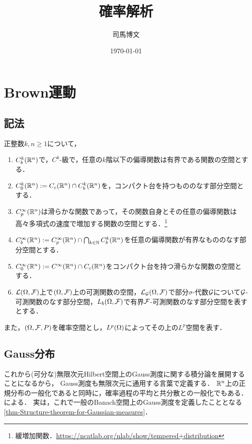 \documentclass[uplatex,dvipdfmx]{jsreport}
\title{確率解析}
\author{司馬博文}
\date{\today}
\begin{document}
\tableofcontents

\chapter{Brown運動}



\section{記法}

\begin{notation}
    正整数$k,n\ge1$について，
    \begin{enumerate}
        \item $C_b^k(\mathbb{R}^n)$で，$C^k$-級で，任意の$k$階以下の偏導関数は有界である関数の空間とする．
        \item $C_0^k(\mathbb{R}^n):=C_c(\mathbb{R}^n)\cap C_b^k(\mathbb{R}^n)$を，コンパクト台を持つもののなす部分空間とする．
        \item $C_p^\infty(\mathbb{R}^n)$は滑らかな関数であって，その関数自身とその任意の偏導関数は高々多項式の速度で増加する関数の空間とする．\footnote{緩増加関数．\url{https://ncatlab.org/nlab/show/tempered+distribution}}
        \item $C_b^\infty(\mathbb{R}^n):=C_p^\infty(\mathbb{R}^n)\cap\bigcap_{k\in\mathbb{N}}C_b^k(\mathbb{R}^n)$を任意の偏導関数が有界なもののなす部分空間とする．
        \item $C_0^\infty(\mathbb{R}^n):=C^\infty(\mathbb{R}^n)\cap C_c(\mathbb{R}^n)$をコンパクト台を持つ滑らかな関数の空間とする．
        \item $\mathcal{L}(\Omega,\mathcal{F})$上で$(\Omega,\mathcal{F})$上の可測関数の空間，$\mathcal{L}_{\mathcal{G}}(\Omega,\mathcal{F})$で部分$\sigma$-代数$\mathcal{G}$について$\mathcal{G}$-可測関数のなす部分空間，$L_b(\Omega,\mathcal{F})$で有界$\mathcal{F}$-可測関数のなす部分空間を表すとする．
    \end{enumerate}
    また，$(\Omega,\mathcal{F},P)$を確率空間とし，$L^p(\Omega)$によってその上の$L^p$空間を表す．
\end{notation}

\section{Gauss分布}

\begin{tcolorbox}[colframe=ForestGreen, colback=ForestGreen!10!white,breakable,colbacktitle=ForestGreen!40!white,coltitle=black,fonttitle=\bfseries\sffamily,
title=]
    これから(可分な)無限次元Hilbert空間上のGauss測度に関する積分論を展開することになるから，
    Gauss測度も無限次元に通用する言葉で定義する．
    $\mathbb{R}^n$上の正規分布の一般化であると同時に，確率過程の平均と共分散との一般化でもある．
    \cite{Prato}による．
    実は，これで一般のBanach空間上のGauss測度を定義したこととなる\ref{thm-Structure-theorem-for-Gaussian-measures}．
\end{tcolorbox}
\end{document}

